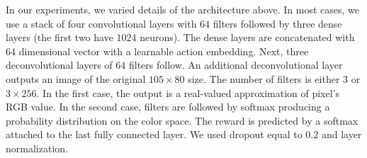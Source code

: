 

In our experiments, we varied details of the architecture above. In most cases, we use a stack of four convolutional layers with $64$ filters followed by three dense layers (the first two have $1024$ neurons). The dense layers are concatenated with $64$ dimensional vector with a learnable action embedding. Next, three deconvolutional layers of $64$ filters follow. An additional deconvolutional layer outputs an image of the original $105\times 80$ size. The number of filters is either $3$ or $3 \times 256$. In the first case, the output is a real-valued approximation of pixel's RGB value. In the second case, filters are followed by softmax producing a probability distribution on the color space. The reward is predicted by a softmax attached to the last fully connected layer. 
We used dropout equal to $0.2$ and layer normalization. 

